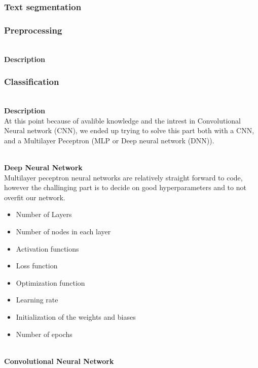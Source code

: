 \documentclass[11pt,a4paper,english]{article}
\begin{document}
\subsubsection{Text segmentation}
\subsubsection{Preprocessing}
\noindent \\ \textbf{Description}
\noindent \\

\subsubsection{Classification}
\noindent \\ \textbf{Description}
\noindent \\ At this point because of avalible knowledge and the intrest in
Convolutional Neural network (CNN), we ended up trying to solve this part
both with a CNN, and a Multilayer Peceptron (MLP or Deep neural network (DNN)).

\noindent \\ \textbf{Deep Neural Network}
\noindent \\ Multilayer peceptron neural networks are relatively straight
forward to code, however the challinging part is to decide on good
hyperparameters and to not overfit our network.

\begin{itemize}
 \item{Number of Layers}
 \item{Number of nodes in each layer}
 \item{Activation functions}
 \item{Loss function}
 \item{Optimization function}
 \item{Learning rate}
 \item{Initialization of the weights and biases}
 \item{Number of epochs}
\end{itemize}




\noindent \\ \textbf{Convolutional Neural Network}
\end{document}
